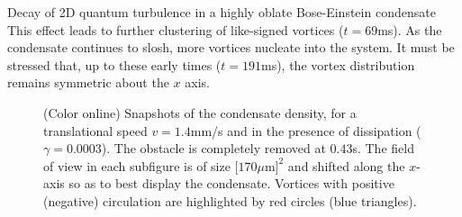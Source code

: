 \begin{chapter}{\label{cha:shin}Decay of 2D quantum turbulence in a highly oblate Bose-Einstein condensate}
This effect leads to further clustering of like-signed vortices   
($t=69$ms). As the condensate continues to slosh, more
vortices nucleate into the system. It must be stressed that,
up to these early times ($t=191$ms), the vortex distribution remains symmetric 
about the $x$ axis.   %

\begin{figure}[!ht]
\begin{center}
\end{center}
\caption{\label{fig:densSnapshots} (Color online) Snapshots of the condensate density, for a translational speed $v=1.4$mm/s and in the presence of dissipation ($\gamma=0.0003$). The obstacle is completely removed at $0.43$s. The field of view in each subfigure is of size $[170\mu$m$]^2$ and shifted along the $x$-axis so as to best display the condensate.  Vortices with positive (negative) circulation are highlighted by red circles (blue triangles).
}
\end{figure}


\end{chapter}
